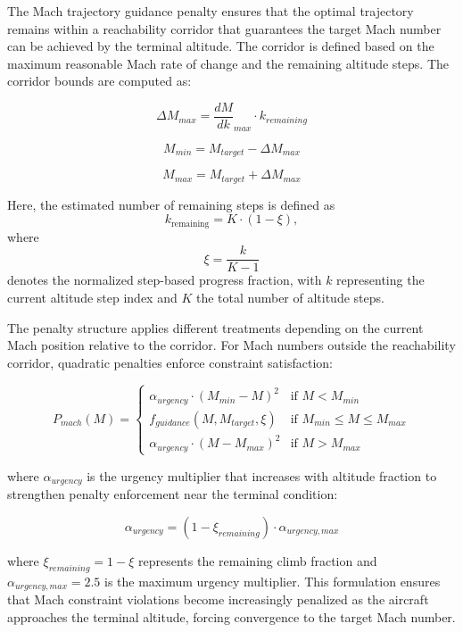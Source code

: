 The Mach trajectory guidance penalty ensures that the optimal trajectory remains within a reachability corridor that guarantees the target Mach number can be achieved by the terminal altitude. The corridor is defined based on the maximum reasonable Mach rate of change and the remaining altitude steps. The corridor bounds are computed as:

\begin{equation}
\Delta M_{max} = \frac{dM}{dk}_{max} \cdot k_{remaining}
\end{equation}

\begin{equation}
M_{min} = M_{target} - \Delta M_{max}
\end{equation}

\begin{equation}
M_{max} = M_{target} + \Delta M_{max}
\end{equation}

Here, the estimated number of remaining steps is defined as
\[
k_{\text{remaining}} = K \cdot (1 - \xi),
\]
where
\[
\xi = \frac{k}{K - 1}
\]
denotes the normalized step-based progress fraction, with $k$ representing the current altitude step index and $K$ the total number of altitude steps.


The penalty structure applies different treatments depending on the current Mach position relative to the corridor. For Mach numbers outside the reachability corridor, quadratic penalties enforce constraint satisfaction:

\begin{equation}
P_{mach}(M) = \begin{cases}
\alpha_{urgency} \cdot (M_{min} - M)^2 & \text{if } M < M_{min} \\
f_{guidance}(M, M_{target}, \xi) & \text{if } M_{min} \leq M \leq M_{max} \\
\alpha_{urgency} \cdot (M - M_{max})^2 & \text{if } M > M_{max}
\end{cases}
\end{equation}

where $\alpha_{urgency}$ is the urgency multiplier that increases with altitude fraction to strengthen penalty enforcement near the terminal condition:

\begin{equation}
\alpha_{urgency} = (1 - \xi_{remaining}) \cdot \alpha_{urgency,max}
\end{equation}

where $\xi_{remaining} = 1 - \xi$ represents the remaining climb fraction and $\alpha_{urgency,max} = 2.5$ is the maximum urgency multiplier. This formulation ensures that Mach constraint violations become increasingly penalized as the aircraft approaches the terminal altitude, forcing convergence to the target Mach number.

